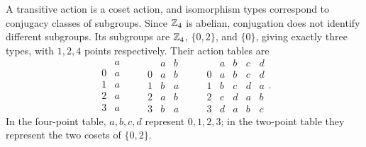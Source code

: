 \idea A transitive action is a coset action, and isomorphism types correspond
to conjugacy classes of subgroups. Since $\mathbb{Z}_4$ is abelian, conjugation does
not identify different subgroups. Its subgroups are $\mathbb{Z}_4$, $\{0,2\}$, and
$\{0\}$, giving exactly three types, with $1,2,4$ points respectively.
Their action tables are
\[
\begin{array}{c|c} &a\\\hline0&a\\1&a\\2&a\\3&a\end{array}
\qquad
\begin{array}{c|cc}&a&b\\\hline0&a&b\\1&b&a\\2&a&b\\3&b&a\end{array}
\qquad
\begin{array}{c|cccc}&a&b&c&d\\\hline
0&a&b&c&d\\1&b&c&d&a\\2&c&d&a&b\\3&d&a&b&c
\end{array}.
\]
In the four-point table, $a,b,c,d$ represent $0,1,2,3$; in the two-point
table they represent the two cosets of $\{0,2\}$.

